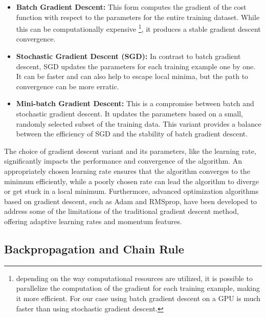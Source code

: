 \documentclass[twoside,11pt]{report}
\begin{document}
    \begin{itemize}
        \item \textbf{Batch Gradient Descent:} This form computes the gradient of the cost function with respect 
            to the parameters for the entire training dataset. While this can be computationally expensive
            \footnote{
                depending on the way computational resources are utilized, it is possible to parallelize the
                computation of the gradient for each training example, making it more efficient.
                For our case using batch gradient descent on a GPU is much faster than using stochastic gradient descent.
            }\label{foot:gpu},
            it produces a stable gradient descent convergence.
        
        \item \textbf{Stochastic Gradient Descent (SGD):} In contrast to batch gradient descent, SGD updates the 
            parameters for each training example one by one. It can be faster 
            and can also help to escape local 
            minima, but the path to convergence can be more erratic.
            \label{sec:he}
            
        
        \item \textbf{Mini-batch Gradient Descent:} This is a compromise between batch and stochastic gradient descent. 
            It updates the parameters based on a small, randomly selected subset of the training data. 
            This variant provides a balance between the efficiency of SGD and the stability of batch gradient descent.
    \end{itemize}

    \noindent
    The choice of gradient descent variant and its parameters, like the learning rate, significantly impacts 
    the performance and convergence of the algorithm. An appropriately chosen learning rate ensures that the 
    algorithm converges to the minimum efficiently, while a poorly chosen rate can lead the algorithm to 
    diverge or get stuck in a local minimum.
    Furthermore, advanced optimization algorithms based on gradient descent, such as Adam and RMSprop, 
    have been developed to address some of the limitations of the traditional gradient descent method, 
    offering adaptive learning rates and momentum features.





\subsection{Backpropagation and Chain Rule}
\label{sec:backpropagation}
\end{document}
